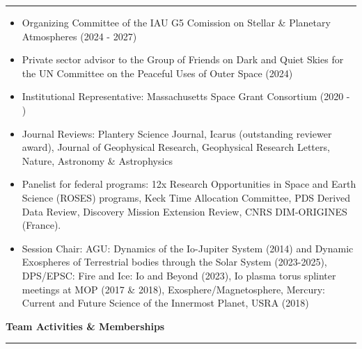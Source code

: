 \documentclass[12pt]{report}
\begin{document}
\rule{\textwidth}{1pt}
\begin{itemize} \itemsep -2pt %
	  \item Organizing Committee of the IAU G5 Comission on Stellar \& Planetary Atmospheres (2024 - 2027)
	  \item Private sector advisor to the Group of Friends on Dark and Quiet Skies for the UN Committee on the Peaceful Uses of Outer Space (2024)
	  \item Institutional Representative: Massachusetts Space Grant Consortium (2020 - )
	  \item Journal Reviews: Plantery Science Journal, Icarus (outstanding reviewer award), Journal of Geophysical Research, Geophysical Research Letters, Nature, Astronomy \& Astrophysics
	  \item Panelist for federal programs: 12x Research Opportunities in Space and Earth Science (ROSES) programs, Keck Time Allocation Committee, PDS Derived Data Review, Discovery Mission Extension Review,  CNRS DIM-ORIGINES (France).
	  \item Session Chair: AGU: Dynamics of the Io-Jupiter System (2014) and Dynamic Exospheres of Terrestrial bodies through the Solar System (2023-2025), DPS/EPSC: Fire and Ice: Io and Beyond (2023), Io plasma torus splinter meetings at MOP (2017 \& 2018), Exosphere/Magnetosphere, Mercury: Current and Future Science of the Innermost Planet, USRA (2018)
\end{itemize}
%
\noindent\bf{Team Activities \& Memberships}\rm \hspace*{\fill} \\
\rule{\textwidth}{1pt}
\end{document}
